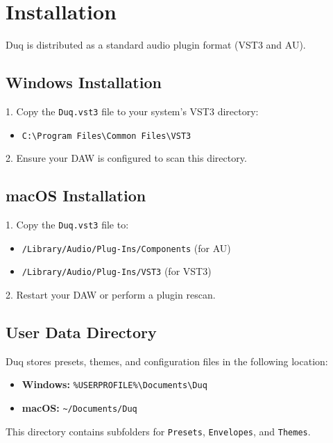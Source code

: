 \chapter{Installation}
\label{ch:installation}

Duq is distributed as a standard audio plugin format (VST3 and AU).

\section{Windows Installation}
1. Copy the \texttt{Duq.vst3} file to your system's VST3 directory:
   \begin{itemize}
       \item \texttt{C:\textbackslash Program Files\textbackslash Common Files\textbackslash VST3}
   \end{itemize}
2. Ensure your DAW is configured to scan this directory.

\section{macOS Installation}
1. Copy the \texttt{Duq.vst3} file to:
   \begin{itemize}
       \item \texttt{/Library/Audio/Plug-Ins/Components} (for AU)
       \item \texttt{/Library/Audio/Plug-Ins/VST3} (for VST3)
   \end{itemize}
2. Restart your DAW or perform a plugin rescan.

\section{User Data Directory}
Duq stores presets, themes, and configuration files in the following location:
\begin{itemize}
    \item \textbf{Windows:} \texttt{\%USERPROFILE\%\textbackslash Documents\textbackslash Duq}
    \item \textbf{macOS:} \texttt{\textasciitilde/Documents/Duq}
\end{itemize}
This directory contains subfolders for \texttt{Presets}, \texttt{Envelopes}, and \texttt{Themes}.
